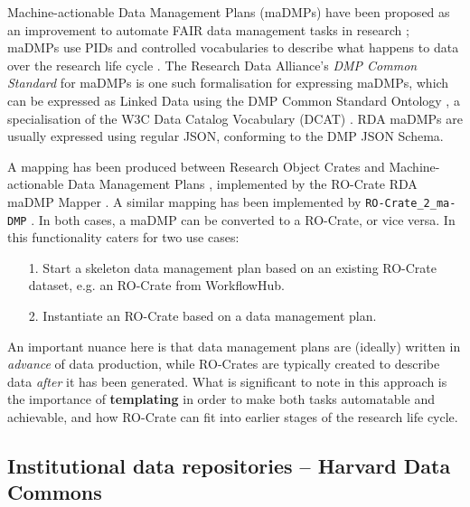 \documentclass[ds,v1.1.2,openaccess]{iosart2x}%
\begin{document}
Machine-actionable Data Management Plans (maDMPs) have been proposed as
an improvement to automate FAIR data management tasks in research
\cite{doi:10.1371/journal.pcbi.1006750}; maDMPs use PIDs and controlled
vocabularies to describe what happens to data over the research life
cycle \cite{doi:10.1007/978-3-030-45442-5_15}. The Research Data Alliance's
\textit{DMP Common Standard} for maDMPs \cite{doi:10.15497/rda00039} is one such
formalisation for expressing maDMPs, which can be expressed as Linked
Data using the DMP Common Standard Ontology
\cite{doi:10.4126/frl01-006423289}, a specialisation of the W3C Data
Catalog Vocabulary (DCAT) \cite{dcat2}. RDA maDMPs are usually expressed
using regular JSON, conforming to the DMP JSON Schema.

A mapping has been produced between Research Object Crates and
Machine-actionable Data Management Plans
\cite{doi:10.4126/frl01-006423291}, implemented by the RO-Crate RDA maDMP
Mapper \cite{doi:10.5281/zenodo.3922136}. A similar mapping has been
implemented by \texttt{RO-Crate\_2\_ma-DMP} \cite{doi:10.5281/zenodo.3903463}. In
both cases, a maDMP can be converted to a RO-Crate, or vice versa. In
\cite{doi:10.4126/frl01-006423291} this functionality caters for two use cases:
\begin{enumerate}
\item[1.] Start a skeleton data management plan based on an existing RO-Crate
dataset, e.g. an RO-Crate from WorkflowHub.
\item[2.] Instantiate an RO-Crate based on a data management plan.
\end{enumerate}

An important nuance here is that data management plans are (ideally)
written in \textit{advance} of data production, while RO-Crates are typically
created to describe data \textit{after} it has been generated. What is
significant to note in this approach is the importance of
\textbf{templating} in order to make both tasks automatable and achievable,
and how RO-Crate can fit into earlier stages of the research life cycle.
\subsection{Institutional data repositories -- Harvard Data Commons}%

\label{sec:institutionalrepos}
\end{document}

